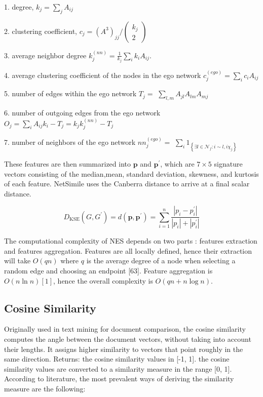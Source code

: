 1. degree, $k_{j}=\sum_{j} A_{i j}$

2. clustering coefficient, $c_{j}=\left(A^{3}\right)_{j j} /\left(\begin{array}{c}k_{j} \\ 2\end{array}\right)$

3. average neighbor degree $k_{j}^{(n n)}=\frac{1}{k_{j}} \sum_{i} k_{i} A_{i j}$.

4. average clustering coefficient of the nodes in the ego network $c_{j}^{(e g o)}=\sum_{i} c_{i} A_{i j}$

5. number of edges within the ego network $T_{j}=$ $\sum_{l, m} A_{j l} A_{l m} A_{m j}$

6. number of outgoing edges from the ego network $O_{j}=\sum_{i} A_{i j} k_{i}-T_{j}=k_{j} k_{j}^{(n n)}-T_{j}$

7. number of neighbors of the ego network $n n_{j}^{(e g o)}=$ $\sum_{i} 1_{\left\{\exists l \in \mathcal{N}_{f}: i \sim l, i \chi_{j}\right\}}$

These features are then summarized into $\mathbf{p}$ and $\mathbf{p}^{\prime}$, which are $7 \times 5$ signature vectors consisting of the median,mean, standard deviation, skewness, and kurtosis of each feature. NetSimile uses the Canberra distance to arrive at a final scalar distance.

$$
D_{\mathrm{KSE}}\left(G, G^{\prime}\right)=d\left(\mathbf{p}, \mathbf{p}^{\prime}\right)=\sum_{i=1}^{n} \frac{\left|p_{i}-p_{i}^{\prime}\right|}{\left|p_{i}\right|+\left|p_{i}^{\prime}\right|}
$$

The computational complexity of NES depends on two parts : features extraction and features aggregation. Features are all locally defined, hence their extraction will take $O(q n)$ where $q$ is the average degree of a node when selecting a random edge and choosing an endpoint [63]. Feature aggregation is $O(n \ln n)[1]$, hence the overall complexity is $O(q n+n \log n)$.

\subsection{Cosine Similarity}
Originally used in text mining for document comparison, the cosine similarity computes the angle between the document vectors, without taking into account their lengths. It assigns higher similarity to vectors that point roughly in the same direction. 
Returns: the cosine similarity values in [-1, 1]. the cosine similarity values are converted to a similarity measure in the range [0, 1]. According to literature, the most prevalent ways of deriving the similarity measure are the following:

